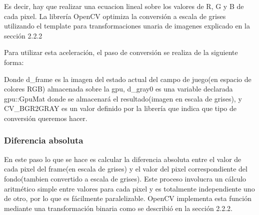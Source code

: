 \documentclass[a4paper,10pt]{report}
\begin{document}
\indent Es decir, hay que realizar una ecuacion lineal sobre los valores de R, G y B de cada pixel. 
La librería OpenCV optimiza la conversión a escala de grises utilizando el template para transformaciones unaria de imagenes explicado en la sección 2.2.2
 
Para utilizar esta aceleración, el paso de conversión se realiza de la siguiente forma:

 \begin{center}
\end{center}


Donde d\_frame es la imagen del estado actual del campo de juego(en espacio de colores RGB) almacenada sobre la gpu, d\_gray0 es una variable declarada gpu::GpuMat donde se almacenará el resultado(imagen en escala de grises),
y CV\_BGR2GRAY es un valor definido por la librería que indica que tipo de conversión queremos hacer.


 

 \subsubsection{Diferencia absoluta}
 En este paso lo que se hace es calcular la diferencia absoluta entre el valor de cada pixel del frame(en escala de grises) y el valor del pixel correspondiente del fondo(tambien convertido a escala de grises). 
 Este proceso involucra un cálculo aritmético simple entre valores para cada pixel y es totalmente independiente uno de otro, por lo que es fácilmente paralelizable. 
OpenCV implementa esta función mediante una transformación binaria como se describió en la sección 2.2.2.
\end{document}
